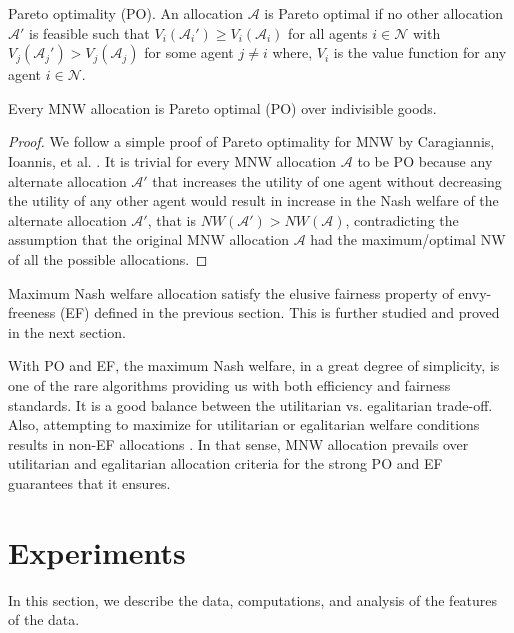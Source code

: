 \begin{definition}{Pareto optimality (PO).}
An allocation $\mathcal{A}$ is Pareto optimal if no other allocation $\mathcal{A'}$ is feasible such that $V_i(\mathcal{A}_i') \geq V_i(\mathcal{A}_i)$ for all agents $i \in \mathcal{N}$ with $ V_j(\mathcal{A}_j') > V_j(\mathcal{A}_j)$ for some agent $j \neq i$ where, $V_i$ is the value function for any agent $i \in \mathcal{N}$.
\end{definition}

\begin{theorem}
Every MNW allocation is Pareto optimal (PO) over indivisible goods.
\end{theorem}

\begin{proof}
We follow a simple proof of Pareto optimality for MNW by Caragiannis, Ioannis, et al. \cite{caragiannis2016unreasonable}. It is trivial for every MNW allocation $\mathcal{A}$ to be PO because any alternate allocation $\mathcal{A}'$ that increases the utility of one agent without decreasing the utility of any other agent would result in increase in the Nash welfare of the alternate allocation $\mathcal{A}'$, that is $NW(\mathcal{A}') > NW(\mathcal{A})$, contradicting the assumption that the original MNW allocation $\mathcal{A}$ had the maximum/optimal NW of all the possible allocations. 
\end{proof}

Maximum Nash welfare allocation satisfy the elusive fairness property of envy-freeness (EF) defined in the previous section. This is further studied and proved in the next section.

With PO and EF, the maximum Nash welfare, in a great degree of simplicity, is one of the rare algorithms providing us with both efficiency and fairness standards. It is a good balance between the utilitarian vs. egalitarian trade-off. Also, attempting to maximize for utilitarian or egalitarian welfare conditions results in non-EF allocations \cite{caragiannis2016unreasonable}. In that sense, MNW allocation prevails over utilitarian and egalitarian allocation criteria for the strong PO and EF guarantees that it ensures.

\section{Experiments}
In this section, we describe the data, computations, and analysis of the features of the data.

